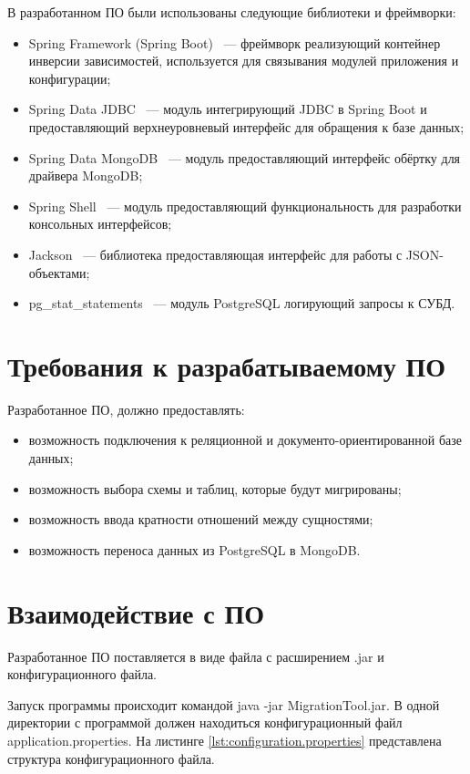 В разработанном ПО были использованы следующие библиотеки и фреймворки:
\begin{itemize}[label=---]
    \item Spring Framework (Spring Boot)~\cite{spring-boot} --- фреймворк реализующий контейнер инверсии зависимостей, 
    используется для связывания модулей приложения и конфигурации;
    \item Spring Data JDBC~\cite{spring-data-jdbc} --- модуль интегрирующий JDBC в Spring Boot и
    предоставляющий верхнеуровневый интерфейс для обращения к базе данных;
    \item Spring Data MongoDB~\cite{spring-data-mongodb} --- модуль предоставляющий интерфейс обёртку для драйвера MongoDB;
    \item Spring Shell~\cite{spring-shell} --- модуль предоставляющий функциональность для разработки консольных интерфейсов;
    \item Jackson~\cite{jackson-databind} --- библиотека предоставляющая интерфейс для работы с JSON-объектами;
    \item pg\_stat\_statements~\cite{pg-stat-statements} --- модуль PostgreSQL логирующий запросы к СУБД.
\end{itemize}

 
\section{Требования к разрабатываемому ПО}
Разработанное ПО, должно предоставлять:
\begin{itemize}[label=---]
    \item возможность подключения к реляционной и документо-ориентированной базе данных;
    \item возможность выбора схемы и таблиц, которые будут мигрированы;
    \item возможность ввода кратности отношений между сущностями;
    \item возможность переноса данных из PostgreSQL в MongoDB.
\end{itemize}


\clearpage

\section{Взаимодействие с ПО}
Разработанное ПО поставляется в виде файла с расширением \textmd{.jar} и конфигурационного файла.

Запуск программы происходит командой \textmd{java -jar MigrationTool.jar}. 
В одной директории с программой должен находиться конфигурационный файл \textmd{application.properties}.
На листинге \ref{lst:configuration.properties} представлена структура конфигурационного файла.


